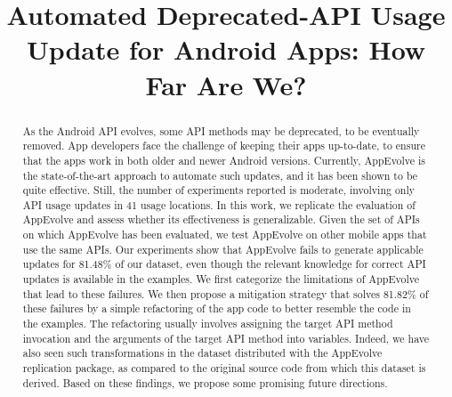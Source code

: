 \documentclass[conference]{IEEEtran}
\begin{document}
\def \toolname {AppEvolve}
\title{Automated Deprecated-API Usage Update for Android Apps: How Far Are We?}

\author{

}

\maketitle

\begin{abstract}
As the Android API evolves, some API methods may be deprecated, to be
eventually removed.  App developers face the challenge of keeping their
apps up-to-date, to ensure that the apps work in both older and newer
Android versions.  Currently, AppEvolve is the state-of-the-art approach to
automate such updates, and it has been shown to be quite effective.  Still,
the number of experiments reported is moderate, involving only API usage
updates in 41 usage locations. In this work, we replicate the evaluation of
AppEvolve and assess whether its effectiveness is generalizable. Given the
set of APIs on which AppEvolve has been evaluated, we test AppEvolve on
other mobile apps that use the same APIs. Our experiments show that
AppEvolve fails to generate applicable updates for 81.48\% of our dataset,
even though the relevant knowledge for correct API updates is available in
the examples. We first categorize the limitations of AppEvolve that lead to
these failures.  We then propose a mitigation strategy that solves 81.82\%
of these failures by a simple refactoring of the app code to better
resemble the code in the examples. The refactoring usually involves
assigning the target API method invocation and the arguments of the target
API method into variables.  Indeed, we have also seen such transformations
in the dataset distributed with the AppEvolve replication package, as
compared to the original source code from which this dataset is derived.
Based on these findings, we propose some promising future directions.
\end{abstract}
\end{document}
